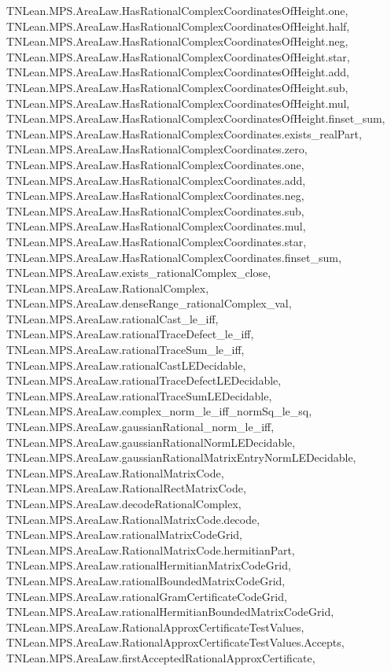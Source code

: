 \begin{lemma}
{        TNLean.MPS.AreaLaw.HasRationalComplexCoordinatesOfHeight.one,
        TNLean.MPS.AreaLaw.HasRationalComplexCoordinatesOfHeight.half,
        TNLean.MPS.AreaLaw.HasRationalComplexCoordinatesOfHeight.neg,
        TNLean.MPS.AreaLaw.HasRationalComplexCoordinatesOfHeight.star,
        TNLean.MPS.AreaLaw.HasRationalComplexCoordinatesOfHeight.add,
        TNLean.MPS.AreaLaw.HasRationalComplexCoordinatesOfHeight.sub,
        TNLean.MPS.AreaLaw.HasRationalComplexCoordinatesOfHeight.mul,
        TNLean.MPS.AreaLaw.HasRationalComplexCoordinatesOfHeight.finset_sum,
        TNLean.MPS.AreaLaw.HasRationalComplexCoordinates.exists_realPart,
        TNLean.MPS.AreaLaw.HasRationalComplexCoordinates.zero,
        TNLean.MPS.AreaLaw.HasRationalComplexCoordinates.one,
        TNLean.MPS.AreaLaw.HasRationalComplexCoordinates.add,
        TNLean.MPS.AreaLaw.HasRationalComplexCoordinates.neg,
        TNLean.MPS.AreaLaw.HasRationalComplexCoordinates.sub,
        TNLean.MPS.AreaLaw.HasRationalComplexCoordinates.mul,
        TNLean.MPS.AreaLaw.HasRationalComplexCoordinates.star,
        TNLean.MPS.AreaLaw.HasRationalComplexCoordinates.finset_sum,
        TNLean.MPS.AreaLaw.exists_rationalComplex_close,
        TNLean.MPS.AreaLaw.RationalComplex,
        TNLean.MPS.AreaLaw.denseRange_rationalComplex_val,
        TNLean.MPS.AreaLaw.rationalCast_le_iff,
        TNLean.MPS.AreaLaw.rationalTraceDefect_le_iff,
        TNLean.MPS.AreaLaw.rationalTraceSum_le_iff,
        TNLean.MPS.AreaLaw.rationalCastLEDecidable,
        TNLean.MPS.AreaLaw.rationalTraceDefectLEDecidable,
        TNLean.MPS.AreaLaw.rationalTraceSumLEDecidable,
        TNLean.MPS.AreaLaw.complex_norm_le_iff_normSq_le_sq,
        TNLean.MPS.AreaLaw.gaussianRational_norm_le_iff,
        TNLean.MPS.AreaLaw.gaussianRationalNormLEDecidable,
        TNLean.MPS.AreaLaw.gaussianRationalMatrixEntryNormLEDecidable,
        TNLean.MPS.AreaLaw.RationalMatrixCode,
        TNLean.MPS.AreaLaw.RationalRectMatrixCode,
        TNLean.MPS.AreaLaw.decodeRationalComplex,
        TNLean.MPS.AreaLaw.RationalMatrixCode.decode,
        TNLean.MPS.AreaLaw.rationalMatrixCodeGrid,
        TNLean.MPS.AreaLaw.RationalMatrixCode.hermitianPart,
        TNLean.MPS.AreaLaw.rationalHermitianMatrixCodeGrid,
        TNLean.MPS.AreaLaw.rationalBoundedMatrixCodeGrid,
        TNLean.MPS.AreaLaw.rationalGramCertificateCodeGrid,
        TNLean.MPS.AreaLaw.rationalHermitianBoundedMatrixCodeGrid,
        TNLean.MPS.AreaLaw.RationalApproxCertificateTestValues,
        TNLean.MPS.AreaLaw.RationalApproxCertificateTestValues.Accepts,
        TNLean.MPS.AreaLaw.firstAcceptedRationalApproxCertificate,
}
\end{lemma}
